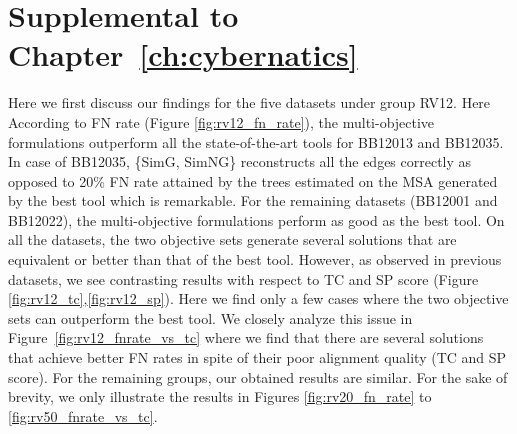 \section{Supplemental to Chapter~\ref{ch:cybernatics}}


Here we first discuss our findings for the five datasets under group RV12. Here According to FN rate (Figure \ref{fig:rv12_fn_rate}), the multi-objective formulations outperform all the state-of-the-art tools for BB12013 and BB12035. In case of BB12035, \{SimG, SimNG\} reconstructs all the edges correctly as opposed to 20\% FN rate attained by the trees estimated on the MSA generated by the best tool which is remarkable.
For the remaining datasets (BB12001 and BB12022), the multi-objective formulations perform as good as the best tool. On all the datasets, the two objective sets generate several solutions that are equivalent or better than that of the best tool.
However, as observed in previous datasets, we see contrasting results with respect to TC and SP score (Figure \ref{fig:rv12_tc},\ref{fig:rv12_sp}). Here we find only a few cases where the two objective sets can outperform the best tool. We closely analyze this issue in Figure~\ref{fig:rv12_fnrate_vs_tc} where we find that there are several solutions that achieve better FN rates in spite of their poor alignment quality (TC and SP score). For the remaining groups, our obtained results are similar. For the sake of brevity, we only illustrate the results in Figures \ref{fig:rv20_fn_rate} to \ref{fig:rv50_fnrate_vs_tc}.
